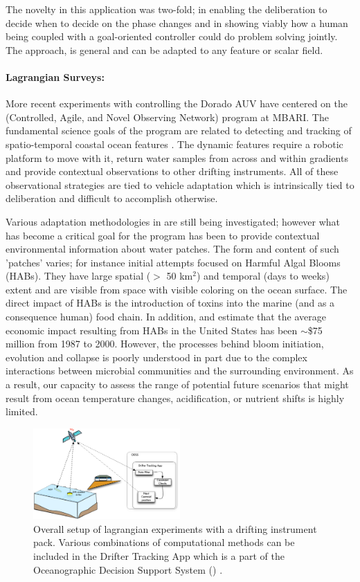 The novelty in this application was two-fold; in enabling the
deliberation to decide when to decide on the phase changes and in
showing viably how a human being coupled with a goal-oriented
controller could do problem solving jointly. The approach, is general
and can be adapted to any feature or scalar field.

\paragraph {Lagrangian Surveys:} More recent experiments with \rx
controlling the Dorado AUV have centered on the \can (Controlled,
Agile, and Novel Observing Network) program at MBARI. The fundamental
science goals of the program are related to detecting and tracking of
spatio-temporal coastal ocean features \cite{canon}. The dynamic
features require a robotic platform to move with it, return water
samples from across and within gradients and provide contextual
observations to other drifting instruments. All of these observational
strategies are tied to vehicle adaptation which is intrinsically tied
to deliberation and difficult to accomplish otherwise.

Various adaptation methodologies in \can are still being
investigated; however what has become a critical goal for the program
has been to provide contextual environmental information about water
patches. The form and content of such 'patches' varies; for instance
initial attempts focused on Harmful Algal Blooms (HABs). They have
large spatial ($>$ 50 km$^2$) and temporal (days to weeks) extent and
are visible from space with visible coloring on the ocean surface. The
direct impact of HABs is the introduction of toxins into the marine
(and as a consequence human) food chain. In addition,
\cite{anderson00} and \cite{hoagland06} estimate that the average
economic impact resulting from HABs in the United States has been
$\sim$\$75 million from 1987 to 2000. However, the processes behind
bloom initiation, evolution and collapse is poorly understood in part
due to the complex interactions between microbial communities and the
surrounding environment. As a result, our capacity to assess the range
of potential future scenarios that might result from ocean temperature
changes, acidification, or nutrient shifts is highly limited.

\begin{figure}[htpb]
\centering
\includegraphics[width=0.5\textwidth]{figs/dta-app.pdf}
\caption{\small{Overall setup of \can lagrangian experiments with a
    drifting instrument pack. Various combinations of computational
    methods can be included in the Drifter Tracking App which is a
    part of the Oceanographic Decision Support System (\od)
    \cite{das11}.}}
\label{fig:dta-setup}
\end{figure}

